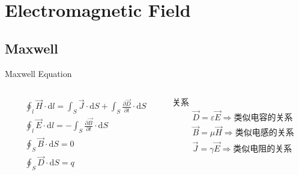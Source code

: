 \section{Electromagnetic Field}
\subsection{Maxwell}
\begin{frame}{Maxwell Equation\cite{冯慈璋2000工程电磁场导论}}
  \begin{columns}
    \begin{column}{0.55\textwidth}
      \begin{align*}
        &\oint_l\vec{H}\cdot\mathrm{d}l=\int_S\vec{J}\cdot\mathrm{d}S+\int_S \frac{\partial\vec{D}}{\partial t}\cdot\mathrm{d}S \\
        &\oint_l\vec{E}\cdot\mathrm{d}l=-\int_S\frac{\partial\vec{B}}{\partial t}\cdot\mathrm{d}S \\
        &\oint_S\vec{B}\cdot\mathrm{d}S=0 \\
        &\oint_S\vec{D}\cdot\mathrm{d}S=q \\
      \end{align*}
    \end{column}
    \begin{column}{0.45\textwidth}
      \begin{block}{关系}
        \begin{align*}
          &\vec{D}=\varepsilon\vec{E} \Rightarrow \mbox{类似电容的关系} \\
          &\vec{B}=\mu\vec{H} \Rightarrow \mbox{类似电感的关系} \\
          &\vec{J}=\gamma\vec{E} \Rightarrow \mbox{类似电阻的关系} \\
        \end{align*}
      \end{block}
    \end{column}
  \end{columns}
\end{frame}

